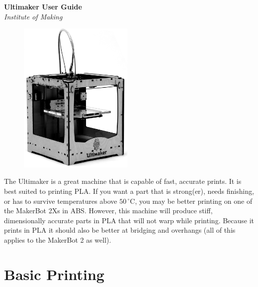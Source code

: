 \documentclass[a4paper,12pt]{article}
\begin{document}
\thispagestyle{empty}

\begin{center}
    \Huge\textbf{Ultimaker User Guide}\\
    \large\textit{Institute of Making}
\end{center}



\vspace*{0.7cm}

\begin{figure}
{\vspace*{-2cm} \includegraphics[width=5.5cm]{ultimaker}}
\end{figure}

\noindent The Ultimaker is a great machine that is capable of fast, accurate prints. It is best suited to printing PLA. If you want a part that is strong(er), needs finishing, or has to
survive temperatures above $50 \,^{\circ}$C, you may be better printing on one of the MakerBot 2Xs in ABS. However, this machine will produce stiff, dimensionally accurate 
parts in PLA that will not warp while printing. Because it prints in PLA it should also be better at bridging and overhangs (all of this applies to the MakerBot 2 as well).

\section*{Basic Printing}
\end{document}
